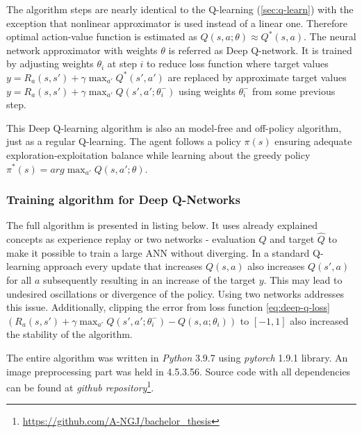 The algorithm steps are nearly identical to the Q-learning (\ref{sec:q-learn}) with the exception that nonlinear approximator is used instead of a linear one. Therefore optimal action-value function is estimated as $Q(s, a; \theta) \approx Q^*(s, a)$. The neural network approximator with weights $\theta$ is referred as Deep Q-network. It is trained by adjusting weights $\theta_i$ at step $i$ to reduce loss function where target values $y = R_a(s, s') + \gamma \max_{a'}Q^*(s', a')$ are replaced by approximate target values $y = R_a(s, s') + \gamma \max_{a'}Q(s', a';\theta^-_i)$ using weights $\theta^-_i$ from some previous step.

This Deep Q-learning algorithm is also an model-free and off-policy algorithm, just as a regular Q-learning. The agent follows a policy $\pi(s)$ ensuring adequate exploration-exploitation balance while learning about the greedy policy $\pi^*(s) = arg\max_{a'}Q(s, a'; \theta)$.

\subsubsection*{Training algorithm for Deep Q-Networks}
\label{sub2:training-algo-for-deep-q-net}

The full algorithm is presented in listing below. It uses already explained concepts as experience replay or two networks - evaluation $Q$ and target $\hat{Q}$ to make it possible to train a large ANN without diverging. In a standard Q-learning approach every update that increases $Q(s, a)$ also increases $Q(s', a)$ for all $a$ subsequently resulting in an increase of the target $y$. This may lead to undesired oscillations or divergence of the policy. Using two networks addresses this issue. Additionally, clipping the error from loss function \ref{eq:deep-q-loss} $\left(R_a(s, s') + \gamma \max_{a'} Q(s', a'; \theta^-_i) - Q(s, a; \theta_i) \right)$ to $[-1, 1]$ also increased the stability of the algorithm.

The entire algorithm was written in \emph{Python} 3.9.7 using \emph{pytorch} 1.9.1 library. An image preprocessing part was held in  4.5.3.56. Source code with all dependencies can be found at \emph{github repository}\footnote{\url{https://github.com/A-NGJ/bachelor_thesis}}.

